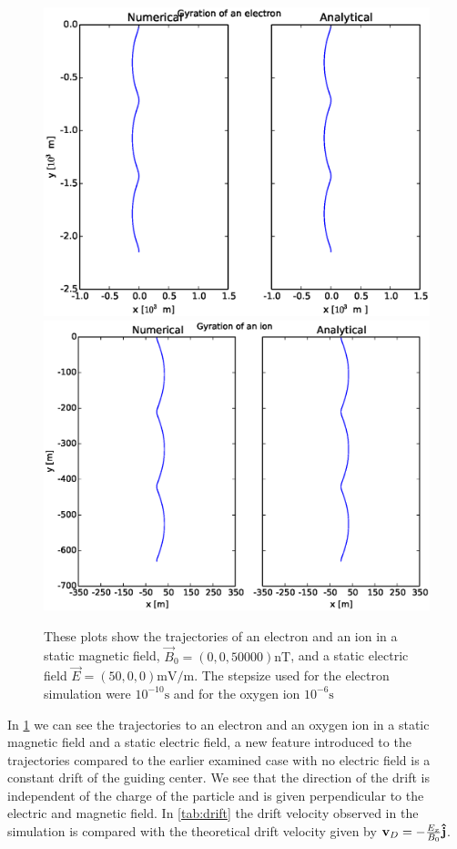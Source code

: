 \documentclass[x11names]{article}
\renewcommand{\va}{\vec}
\begin{document}
      \begin{figure}
            \includegraphics[width = 0.5\linewidth]{../source/ExBelectron}
            \includegraphics[width = 0.5\linewidth]{../source/ExBion}
            \caption{These plots show the trajectories of an electron and an ion in a static magnetic field, \(\va{B}_0 = (0,0,50000) \si{\nano\tesla}\), and a static electric field \( \va{E} = (50,0,0)  \si{\milli\volt\per\meter}\). The stepsize used for the electron simulation were \(10^{-10} \si{\second}\) and for the oxygen ion \(10^{-6} \si{\second}\)}
            \label{fig:ExBDrift}
      \end{figure}

      In \cref{fig:ExBDrift} we can see the trajectories to an electron and an oxygen ion in a static magnetic field and a static electric field, a new feature introduced to the trajectories compared to the earlier examined case with no electric field is a constant drift of the guiding center. We see that the direction of the drift is independent of the charge of the particle and is given perpendicular to the electric and magnetic field. In \cref{tab:drift} the drift velocity observed in the simulation is compared with the theoretical drift velocity given by \(\vb{v}_D = -\frac{E_x}{B_0}\vu{j}\).
\end{document}

